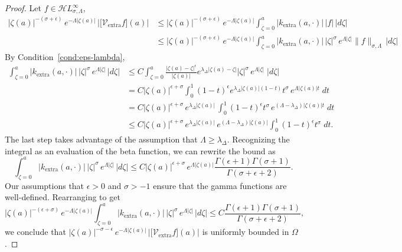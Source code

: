 \documentclass{article}
\theoremstyle{plain}
\newcommand{\singexp}[2]{\mathcal{H}L^\infty_{#1, #2}}
\newcommand{\softpart}{\mathcal{V}_\text{extra}}
\newcommand{\domain}{\Omega}
\begin{document}
\begin{proof}
    Let $f\in\singexp{\sigma}{\Lambda}$,
    \begin{align*}
        |\zeta(a)|^{-(\sigma+\epsilon)} \, e^{-\Lambda |\zeta(a)|} \, \Big \vert \big[ \softpart f\big](a)\Big\vert
        &\leq |\zeta(a)|^{-(\sigma+\epsilon)}\, e^{-\Lambda |\zeta(a)|} \int_{\zeta=0}^a |k_\text{extra}(a,\cdot)|\, |f| \, |d\zeta| \\
        &\leq |\zeta(a)|^{-(\sigma+\epsilon)}\, e^{-\Lambda |\zeta(a)|} \int_{\zeta=0}^a |k_\text{extra}(a,\cdot)|\, |\zeta|^{\sigma}\, e^{\Lambda |\zeta|} \|f\|_{\sigma,\Lambda} \, |d\zeta| 
    \end{align*}
    By Condition~\eqref{cond:eps-lambda},
    \begin{align*}
         \int_{\zeta=0}^a |k_\text{extra}(a,\cdot)|\, |\zeta|^{\sigma}\, e^{\Lambda |\zeta|} \, |d\zeta| &\leq C \int_{\zeta=0}^a \frac{|\zeta(a)-\zeta|^\epsilon}{|\zeta(a)|} e^{\lambda_\Delta |\zeta(a)-\zeta|} |\zeta|^{\sigma}\, e^{\Lambda|\zeta|}\;|d\zeta|\\
         &=C |\zeta(a)|^{\epsilon+\sigma} \int_{0}^1 (1-t)^\epsilon e^{\lambda_\Delta |\zeta(a)|(1-t)} t^{\sigma}\, e^{\Lambda|\zeta(a)| t}\;dt\\
         &=C |\zeta(a)|^{\epsilon+\sigma}\, e^{\lambda_\Delta |\zeta(a)|}\,  \int_{0}^1 (1-t)^\epsilon  t^{\sigma}\,e^{(\Lambda-\lambda_\Delta)|\zeta(a)| t}\;dt\\
         &\le C |\zeta(a)|^{\epsilon+\sigma}\, e^{\lambda_\Delta |\zeta(a)|}\,e^{(\Lambda-\lambda_\Delta)|\zeta(a)|}\int_{0}^1 (1-t)^\epsilon  t^{\sigma}\;dt.
    \end{align*}
    The last step takes advantage of the assumption that $\Lambda \ge \lambda_\Delta$. Recognizing the integral as an evaluation of the beta function, we can rewrite the bound as
    \[ \int_{\zeta=0}^a |k_\text{extra}(a,\cdot)|\, |\zeta|^{\sigma}\, e^{\Lambda |\zeta|} \, |d\zeta| \le C |\zeta(a)|^{\epsilon+\sigma}\, e^{\Lambda |\zeta(a)|} \frac{\Gamma(\epsilon+1)\Gamma(\sigma+1)}{\Gamma(\sigma+\epsilon+2)}. \]
    Our assumptions that $\epsilon > 0$ and $\sigma > -1$ ensure that the gamma functions are well-defined. Rearranging to get
    \[ |\zeta(a)|^{-(\epsilon+\sigma)}\, e^{-\Lambda |\zeta(a)|} \int_{\zeta=0}^a |k_\text{extra}(a,\cdot)|\, |\zeta|^{\sigma}\, e^{\Lambda |\zeta|} \, |d\zeta| \le C \frac{\Gamma(\epsilon+1)\Gamma(\sigma+1)}{\Gamma(\sigma+\epsilon+2)}, \]
    we conclude that $|\zeta(a)|^{-\sigma-\epsilon} \, e^{-\Lambda |\zeta(a)|} \, \Big \vert \big[ \softpart f\big](a)\Big\vert$ is uniformly bounded in $\domain$. 
\end{proof}
\end{document}

